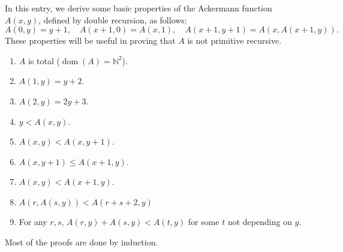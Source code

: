 \documentclass[12pt]{article}
\begin{document}
In this entry, we derive some basic properties of the Ackermann function $A(x,y)$, defined by double recursion, as follows:
$$ A(0,y)  = y + 1,  \quad A(x+1,0)  = A(x,1), \quad A(x+1,y+1) = A(x,A(x+1,y)). $$
These properties will be useful in proving that $A$ is not primitive recursive.

\begin{enumerate}
\item $A$ is total ($\operatorname{dom}(A)=\mathbb{N}^2$).
\item $A(1,y)=y+2$.
\item $A(2,y)=2y+3$.
\item $y<A(x,y)$.
\item $A(x,y)<A(x,y+1)$.
\item $A(x,y+1)\le A(x+1,y)$.
\item $A(x,y)<A(x+1,y)$.
\item $A(r,A(s,y))<A(r+s+2,y)$
\item For any $r,s$, $A(r,y)+A(s,y)< A(t,y)$ for some $t$ not depending on $y$.
\end{enumerate}

Most of the proofs are done by induction.
\end{document}
